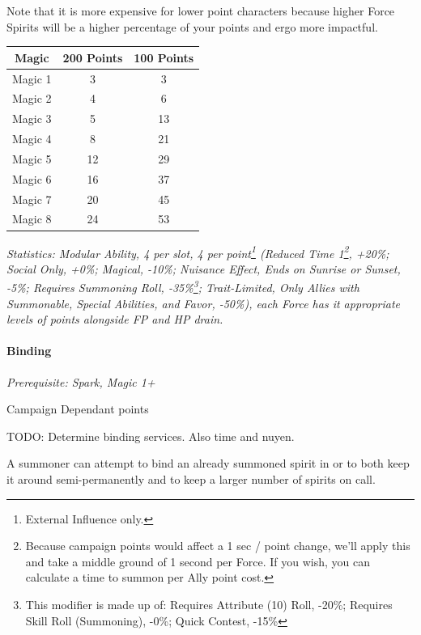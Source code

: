 \begin{multicols*}{3}
	Note that it is more expensive for lower point characters because higher Force Spirits will be a higher percentage of your points and ergo more impactful.
	
	\begin{center}
		\begin{tabular}{|c|c|c|}
			\hline
			Magic & 200 Points & 100 Points \\
			\hline
			\hline
			Magic 1 & 3 & 3 \\
			Magic 2 & 4 & 6 \\
			Magic 3 & 5 & 13 \\
			Magic 4 & 8 & 21 \\
			Magic 5 & 12 & 29 \\
			Magic 6 & 16 & 37 \\
			Magic 7 & 20 & 45 \\
			Magic 8 & 24 & 53 \\
			\hline
		\end{tabular}
	\end{center}
	
	\textit{\textcolor{OliveGreen}{Statistics: Modular Ability, 4 per slot, 4 per point\footnote{External Influence only.} (Reduced Time 1\footnote{Because campaign points would affect a 1 sec / point change, we'll apply this and take a middle ground of 1 second per Force. If you wish, you can calculate a time to summon per Ally point cost.}, +20\%; Social Only, +0\%; Magical, -10\%; Nuisance Effect, Ends on Sunrise or Sunset, -5\%; Requires Summoning Roll, -35\%\footnote{This modifier is made up of: Requires Attribute (10) Roll, -20\%; Requires Skill Roll (Summoning), -0\%; Quick Contest, -15\%}; Trait-Limited, Only Allies with Summonable, Special Abilities, and Favor, -50\%), each Force has it appropriate levels of points alongside FP and HP drain.}}
	
	\paragraph{Binding}\label{binding_spirits}
	\textit{Prerequisite: Spark, Magic 1+}
	\begin{flushright}
		Campaign Dependant points
	\end{flushright}
	
	TODO: Determine binding services. Also time and nuyen.
	
	A summoner can attempt to bind an already summoned spirit in or to both keep it around semi-permanently and to keep a larger number of spirits on call.
	

\end{multicols*}
